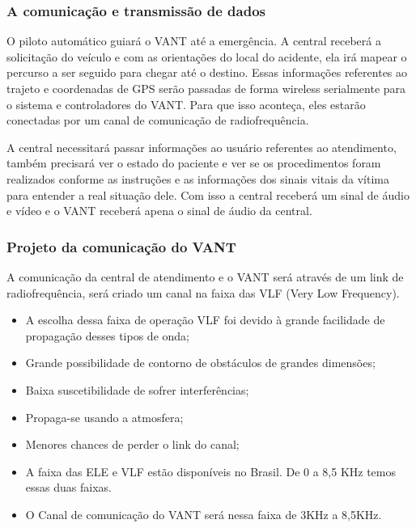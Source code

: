 \subsubsection{A comunicação e transmissão de dados }

O piloto automático guiará o VANT até a emergência. A central receberá a solicitação do veículo e com as orientações do local do acidente, ela irá mapear o percurso a ser seguido para chegar até o destino.  Essas informações referentes ao trajeto e coordenadas de GPS serão passadas de forma wireless serialmente para o sistema e controladores do VANT. Para que isso aconteça, eles estarão conectadas por um canal de comunicação de radiofrequência.

A central necessitará passar informações ao usuário referentes ao atendimento, também precisará ver o estado do paciente e ver se os procedimentos foram realizados conforme as instruções e as informações dos sinais vitais da vítima para entender a real situação dele. Com isso a central receberá um sinal de áudio e vídeo e o VANT receberá apena o sinal de áudio da central. 

\subsubsection{Projeto da comunicação do VANT}
A comunicação da central de atendimento e o VANT será através de um link de radiofrequência, será criado um canal na faixa das VLF (Very Low Frequency).

\begin{itemize}
	\item A escolha dessa faixa de operação VLF foi devido à grande facilidade de propagação desses tipos de onda;
	\item Grande possibilidade de contorno de obstáculos de grandes dimensões;
	\item Baixa suscetibilidade de sofrer interferências;
	\item Propaga-se usando a atmosfera;
	\item Menores chances de perder o link do canal;
	\item A faixa das ELE e VLF estão disponíveis no Brasil. De 0 a 8,5 KHz temos essas duas faixas.
	\item O Canal de comunicação do VANT será nessa faixa de 3KHz a 8,5KHz.
\end{itemize}

\pagebreak
